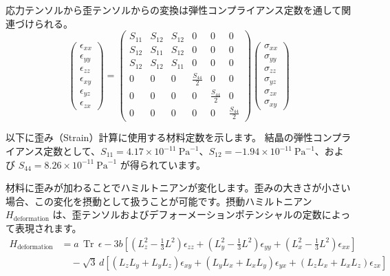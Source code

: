 応力テンソルから歪テンソルからの変換は弾性コンプライアンス定数を通して関連づけられる。
\begin{equation}
\begin{pmatrix}
    \epsilon_{xx} \\
    \epsilon_{yy} \\
    \epsilon_{zz} \\
    \epsilon_{xy} \\
    \epsilon_{yz} \\
    \epsilon_{zx}
\end{pmatrix} = 
\begin{pmatrix}
    S_{11} & S_{12} & S_{12} & 0 & 0 & 0 \\
    S_{12} & S_{11} & S_{12} & 0 & 0 & 0 \\
    S_{12} & S_{12} & S_{11} & 0 & 0 & 0 \\
    0 & 0 & 0 & \frac{S_{44}}{2} & 0 & 0 \\
    0 & 0 & 0 & 0 & \frac{S_{44}}{2} & 0 \\
    0 & 0 & 0 & 0 & 0 & \frac{S_{44}}{2}
\end{pmatrix}
\begin{pmatrix}
    \sigma_{xx} \\
    \sigma_{yy} \\
    \sigma_{zz} \\
    \sigma_{yz} \\
    \sigma_{zx} \\
    \sigma_{xy}
\end{pmatrix}
\end{equation}

以下に歪み（Strain）計算に使用する材料定数を示します。
結晶の弾性コンプライアンス定数として、\( S_{11} = 4.17 \times 10^{-11}~\text{Pa}^{-1} \)、\( S_{12} = -1.94 \times 10^{-11}~\text{Pa}^{-1} \)、および \( S_{44} = 8.26 \times 10^{-11}~\text{Pa}^{-1} \) が得られています。

材料に歪みが加わることでハミルトニアンが変化します。歪みの大きさが小さい場合、この変化を摂動として扱うことが可能です。摂動ハミルトニアン $H_{\text{deformation}}$ は、歪テンソルおよびデフォーメーションポテンシャルの定数によって表現されます。
\begin{align}
H_{\text{deformation}} &= a \, \operatorname{Tr}\, \epsilon 
- 3b \left[ \left(L_z^2 - \frac{1}{3} L^2 \right)\epsilon_{zz} 
+ \left(L_y^2 - \frac{1}{3} L^2 \right)\epsilon_{yy} 
+ \left(L_x^2 - \frac{1}{3} L^2 \right)\epsilon_{xx} \right] \\
&\quad - \sqrt{3}\,d \left[ (L_z L_y + L_y L_z)\epsilon_{xy} 
+ (L_y L_x + L_x L_y)\epsilon_{yx} 
+ (L_z L_x + L_x L_z)\epsilon_{zx} \right]
\end{align}

